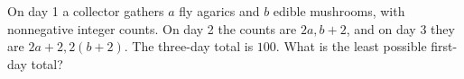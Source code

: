 On day 1 a collector gathers $a$ fly agarics and $b$ edible mushrooms, with nonnegative integer counts. On day 2 the counts are $2a,b+2$, and on day 3 they are $2a+2,2(b+2)$. The three-day total is $100$. What is the least possible first-day total?
